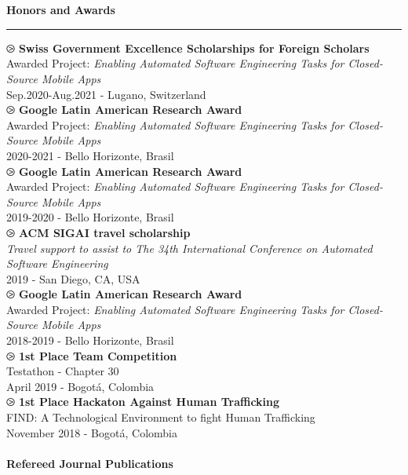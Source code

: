 \documentclass[letterpaper,11pt,oneside]{article}
\begin{document}
\\ \\
\noindent \Large{\textbf{Honors and Awards}} \\
\vspace{-2ex}
\hrule 
\normalsize
\vspace{2ex}
\noindent $\ogreaterthan$ \textbf{Swiss Government Excellence Scholarships for Foreign Scholars} \\
Awarded Project: \textit{Enabling Automated Software Engineering Tasks for Closed-Source Mobile Apps}\\
Sep.2020-Aug.2021 - Lugano, Switzerland \\
\noindent $\ogreaterthan$ \textbf{Google Latin American Research Award} \\
Awarded Project: \textit{Enabling Automated Software Engineering Tasks for Closed-Source Mobile Apps}\\
2020-2021 - Bello Horizonte, Brasil \\
\noindent $\ogreaterthan$ \textbf{Google Latin American Research Award} \\
Awarded Project: \textit{Enabling Automated Software Engineering Tasks for Closed-Source Mobile Apps}\\
2019-2020 - Bello Horizonte, Brasil \\
\noindent $\ogreaterthan$ \textbf{ACM SIGAI travel scholarship} \\
\textit{Travel support to assist to The 34th International Conference on Automated Software Engineering }\\
2019 - San Diego, CA, USA \\
\noindent $\ogreaterthan$ \textbf{Google Latin American Research Award} \\
Awarded Project: \textit{Enabling Automated Software Engineering Tasks for Closed-Source Mobile Apps}\\
2018-2019 - Bello Horizonte, Brasil \\
\noindent $\ogreaterthan$ \textbf{1st Place Team Competition} \\
Testathon - Chapter 30\\
April 2019 - Bogotá, Colombia \\
\noindent $\ogreaterthan$ \textbf{1st Place Hackaton Against Human Trafficking} \\
FIND: A Technological Environment to fight Human Trafficking\\
November 2018 - Bogotá, Colombia \\
\\
\noindent \Large{\textbf{Refereed Journal Publications}} \\
\end{document}
